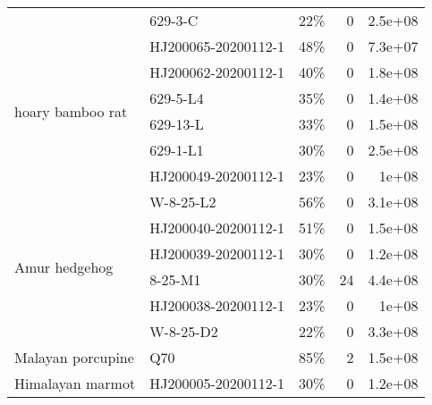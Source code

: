 \begin{tabular}{llrrr}
                 & 629-3-C &                                22\% &                        0 &                   2.5e+08 \\
\cline{1-5}
\multirow{6}{*}{hoary bamboo rat} & HJ200065-20200112-1 &                                48\% &                        0 &                   7.3e+07 \\
                 & HJ200062-20200112-1 &                                40\% &                        0 &                   1.8e+08 \\
                 & 629-5-L4 &                                35\% &                        0 &                   1.4e+08 \\
                 & 629-13-L &                                33\% &                        0 &                   1.5e+08 \\
                 & 629-1-L1 &                                30\% &                        0 &                   2.5e+08 \\
                 & HJ200049-20200112-1 &                                23\% &                        0 &                     1e+08 \\
\cline{1-5}
\multirow{6}{*}{Amur hedgehog} & W-8-25-L2 &                                56\% &                        0 &                   3.1e+08 \\
                 & HJ200040-20200112-1 &                                51\% &                        0 &                   1.5e+08 \\
                 & HJ200039-20200112-1 &                                30\% &                        0 &                   1.2e+08 \\
                 & 8-25-M1 &                                30\% &                       24 &                   4.4e+08 \\
                 & HJ200038-20200112-1 &                                23\% &                        0 &                     1e+08 \\
                 & W-8-25-D2 &                                22\% &                        0 &                   3.3e+08 \\
\cline{1-5}
Malayan porcupine & Q70 &                                85\% &                        2 &                   1.5e+08 \\
Himalayan marmot & HJ200005-20200112-1 &                                30\% &                        0 &                   1.2e+08 \\
\bottomrule
\end{tabular}
